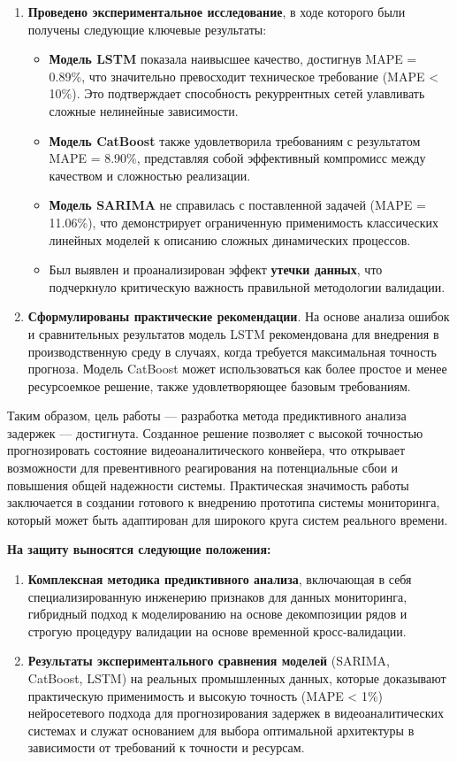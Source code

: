 \begin{enumerate}
    \item \textbf{Проведено экспериментальное исследование}, в ходе которого были получены следующие ключевые результаты:
    \begin{itemize}
        \item \textbf{Модель LSTM} показала наивысшее качество, достигнув MAPE = 0.89\%, что значительно превосходит техническое требование (MAPE < 10\%). Это подтверждает способность рекуррентных сетей улавливать сложные нелинейные зависимости.
        \item \textbf{Модель CatBoost} также удовлетворила требованиям с результатом MAPE = 8.90\%, представляя собой эффективный компромисс между качеством и сложностью реализации.
        \item \textbf{Модель SARIMA} не справилась с поставленной задачей (MAPE = 11.06\%), что демонстрирует ограниченную применимость классических линейных моделей к описанию сложных динамических процессов.
        \item Был выявлен и проанализирован эффект \textbf{утечки данных}, что подчеркнуло критическую важность правильной методологии валидации.
    \end{itemize}

    \item \textbf{Сформулированы практические рекомендации}. На основе анализа ошибок и сравнительных результатов модель LSTM рекомендована для внедрения в производственную среду в случаях, когда требуется максимальная точность прогноза. Модель CatBoost может использоваться как более простое и менее ресурсоемкое решение, также удовлетворяющее базовым требованиям.
\end{enumerate}

Таким образом, цель работы — разработка метода предиктивного анализа задержек — достигнута. Созданное решение позволяет с высокой точностью прогнозировать состояние видеоаналитического конвейера, что открывает возможности для превентивного реагирования на потенциальные сбои и повышения общей надежности системы. Практическая значимость работы заключается в создании готового к внедрению прототипа системы мониторинга, который может быть адаптирован для широкого круга систем реального времени.

\vspace{1cm}
\textbf{На защиту выносятся следующие положения:}
\begin{enumerate}
    \item \textbf{Комплексная методика предиктивного анализа}, включающая в себя специализированную инженерию признаков для данных мониторинга, гибридный подход к моделированию на основе декомпозиции рядов и строгую процедуру валидации на основе временной кросс-валидации.
    \item \textbf{Результаты экспериментального сравнения моделей} (SARIMA, \\CatBoost, LSTM) на реальных промышленных данных, которые доказывают практическую применимость и высокую точность (MAPE < 1\%) нейросетевого подхода для прогнозирования задержек в видеоаналитических системах и служат основанием для выбора оптимальной архитектуры в зависимости от требований к точности и ресурсам.
\end{enumerate}
